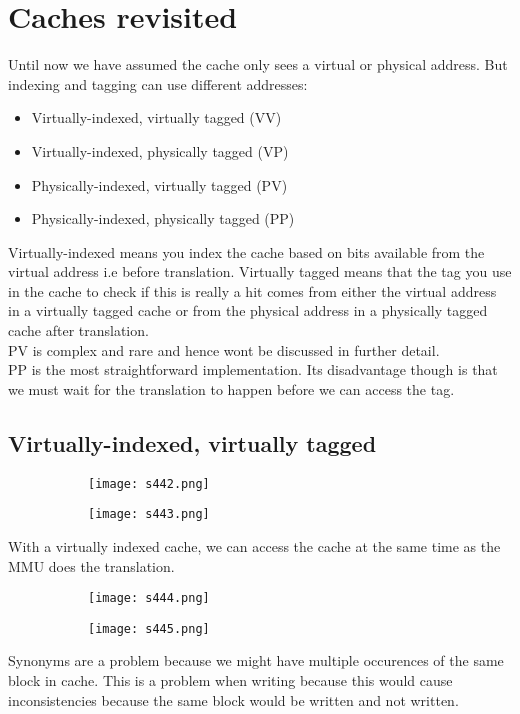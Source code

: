 \documentclass[8pt]{extreport}
\begin{document}
\section{Caches revisited}

Until now we have assumed the cache only sees a virtual or physical address. But indexing and tagging can use different addresses:
\begin{itemize}
\item Virtually-indexed, virtually tagged (VV)
\item Virtually-indexed, physically tagged (VP)
\item Physically-indexed, virtually tagged (PV)
\item Physically-indexed, physically tagged (PP)
\end{itemize}
Virtually-indexed means you index the cache based on bits available from the virtual address i.e before translation. Virtually tagged means that the tag you use in the cache to check if this is really a hit comes from either the virtual address in a virtually tagged cache or from the physical address in a physically tagged cache after translation.\\
PV is complex and rare and hence wont be discussed in further detail.\\
PP is the most straightforward implementation. Its disadvantage though is that we must wait for the translation to happen before we can access the tag.

\subsection{Virtually-indexed, virtually tagged}
\begin{figure}[H]
\begin{subfigure}[b]{0.4\linewidth}
\texttt{[image: s442.png]}
\end{subfigure}
\begin{subfigure}[b]{0.4\linewidth}
\texttt{[image: s443.png]}
\end{subfigure}
\end{figure}
With a virtually indexed cache, we can access the cache at the same time as the MMU does the translation.
\begin{figure}[H]
\begin{subfigure}[b]{0.4\linewidth}
\texttt{[image: s444.png]}
\end{subfigure}
\begin{subfigure}[b]{0.4\linewidth}
\texttt{[image: s445.png]}
\end{subfigure}
\end{figure}
Synonyms are a problem because we might have multiple occurences of the same block in cache. This is a problem when writing because this would cause inconsistencies because the same block would be written and not written.
\end{document}
